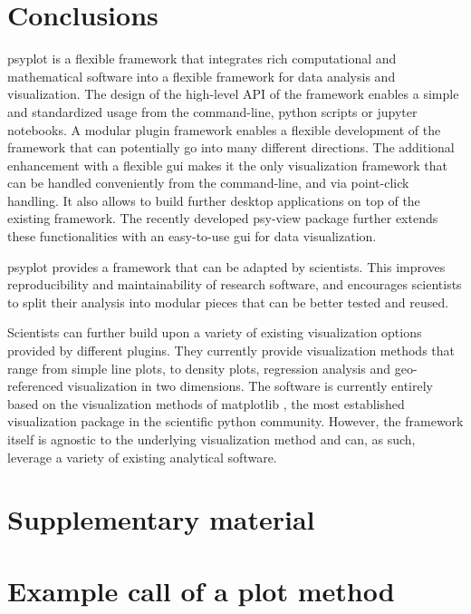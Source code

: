 \documentclass[
11pt, %
english, %
singlespacing, %
headsepline, %
]{article} %
\begin{document}
\begin{refsection}
\section{Conclusions}  \label{sec:psyplot-conclusions}
psyplot \citep{Sommer2017} is a flexible framework that integrates rich computational and mathematical software into a flexible framework for data analysis and visualization. The design of the high-level API of the framework enables a simple and standardized usage from the command-line, python scripts or jupyter notebooks. A modular plugin framework enables a flexible development of the framework that can potentially go into many different directions. The additional enhancement with a flexible \gls{gui} makes it the only visualization framework that can be handled conveniently from the command-line, and via point-click handling. It also allows to build further desktop applications on top of the existing framework. The recently developed psy-view package further extends these functionalities with an easy-to-use \gls{gui} for data visualization.

psyplot provides a framework that can be adapted by scientists. This improves reproducibility and maintainability of research software, and encourages scientists to split their analysis into modular pieces that can be better tested and reused.

Scientists can further build upon a variety of existing visualization options provided by different plugins. They currently provide visualization methods that range from simple line plots, to density plots, regression analysis and geo-referenced visualization in two dimensions. The software is currently entirely based on the visualization methods of matplotlib \citep{Hunter2007}, the most established visualization package in the scientific python community. However, the framework itself is agnostic to the underlying visualization method and can, as such, leverage a variety of existing analytical software.


\clearpage

\begin{subappendices}
	\section*{Supplementary material}
	\section{Example call of a plot method}  \label{sec:psyplot-example}
	

\end{subappendices}
\end{refsection}
\end{document}
